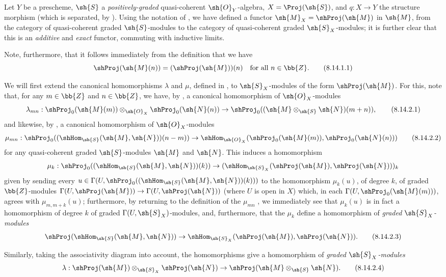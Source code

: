 \begin{env}[8.14.1]
\label{II.8.14.1}
Let $Y$ be a prescheme, $\sh{S}$ a \emph{positively-graded} quasi-coherent $\sh{O}_Y$-algebra, $X=\Proj(\sh{S})$, and $q:X\to Y$ the structure morphism (which is separated, by ).
Using the notation of , we have defined a functor $\sh{M}_X=\shProj(\sh{M})$ in $\sh{M}$, from the category of quasi-coherent graded $\sh{S}$-modules to the category of quasi-coherent graded $\sh{S}_X$-modules;
it is further clear  that this is an \emph{additive} and \emph{exact} functor, commuting with inductive limits.

Note, furthermore, that it follows immediately from the definition  that we have
\[
\label{II.8.14.1.1}
    \shProj(\sh{M}(n)) = (\shProj(\sh{M}))(n)
    \quad\mbox{for all $n\in\bb{Z}$.}
\tag{8.14.1.1}
\]
\end{env}

\begin{env}[8.14.2]
\label{II.8.14.2}
We will first extend the canonical homomorphisms $\lambda$ and $\mu$, defined in , to $\sh{S}_X$-modules of the form $\shProj(\sh{M})$.
For this, note that, for any $m\in\bb{Z}$ and $n\in\bb{Z}$, we have, by , a canonical homomorphism of $\sh{O}_X$-modules
\[
\label{II.8.14.2.1}
    \lambda_{mn}:
    \shProj_0(\sh{M}(m))\otimes_{\sh{O}_X}\shProj_0(\sh{N}(n))
    \to
    \shProj_0((\sh{M}\otimes_{\sh{S}}\sh{N})(m+n)),
\tag{8.14.2.1}
\]
and likewise, by , a canonical homomorphism of $\sh{O}_X$-modules
\[
\label{II.8.14.2.2}
    \mu_{mn}:
    \shProj_0((\shHom_{\sh{S}}(\sh{M},\sh{N}))(n-m))
    \to
    \shHom_{\sh{O}_X}(\shProj_0(\sh{M}(m)),\shProj_0(\sh{N}(n)))
\tag{8.14.2.2}
\]
for any quasi-coherent graded $\sh{S}$-modules $\sh{M}$ and $\sh{N}$.
This induces a homomorphism
\[
    \mu_k:
    \shProj_0((\shHom_{\sh{S}}(\sh{M},\sh{N}))(k))
    \to
    (\shHom_{\sh{S}_X}(\shProj(\sh{M}),\shProj(\sh{N})))_k
\]
given by sending every $u\in\Gamma(U,\shProj_0((\shHom_{\sh{S}}(\sh{M},\sh{N}))(k)))$ to the homomorphism $\mu_k(u)$, of degree $k$, of graded $\bb{Z}$-modules $\Gamma(U,\shProj(\sh{M}))\to\Gamma(U,\shProj(\sh{N}))$ (where $U$ is open in $X$) which, in each $\Gamma(U,\shProj_0(\sh{M}(m)))$, agrees with $\mu_{m,m+k}(u)$;
furthermore, by returning to the definition of the $\mu_{mn}$ , we immediately see that $\mu_k(u)$ is in fact a homomorphism of degree $k$ of graded $\Gamma(U,\sh{S}_X)$-modules, and, furthermore, that the $\mu_k$ define a homomorphism of \emph{graded $\sh{S}_X$-modules}
\[
\label{II.8.14.2.3}
    \shProj(\shHom_{\sh{S}}(\sh{M},\sh{N}))
    \to
    \shHom_{\sh{S}_X}(\shProj(\sh{M}),\shProj(\sh{N})).
\tag{8.14.2.3}
\]

Similarly, taking the associativity diagram  into account, the homomorphisms  give a homomorphism of \emph{graded $\sh{S}_X$-modules}
\[
\label{II.8.14.2.4}
    \lambda:
    \shProj(\sh{M})\otimes_{\sh{S}_X}\shProj(\sh{N})
    \to
    \shProj(\sh{M}\otimes_{\sh{S}}\sh{N}).
\tag{8.14.2.4}
\]
\end{env}

